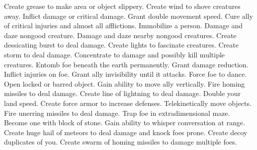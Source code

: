     {Create grease to make area or object slippery.}
    {Create wind to shove creatures away.}
    {Inflict damage or critical damage.}
    {Grant double movement speed.}
    {Cure ally of critical injuries and almost all afflictions.}
    {Immobilize a person.}
    {Damage and daze nongood creature.}
    {Damage and daze nearby nongood creatures.}
    {Create dessicating burst to deal damage.}
    {Create lights to fascinate creatures.}
    {Create storm to deal damage.}
    {Concentrate to damage and possibly kill multiple creatures.}
    {Entomb foe beneath the earth permanently.}
    {Grant damage reduction.}
    {Inflict injuries on foe.}
    {Grant ally invisibility until it attacks.}
    {Force foe to dance.}
    {Open locked or barred object.}
    {Gain ability to move ally vertically.}
    {Fire homing missiles to deal damage.}
    {Create line of lightning to deal damage.}
    {Double your land speed.}
    {Create force armor to increase defenses.}
    {Telekinetically move objects.}
    {Fire unerring missiles to deal damage.}
    {Trap foe in extradimensional maze.}
    {Become one with block of stone.}
    {Gain ability to whisper conversation at range.}
    {Create huge hail of meteors to deal damage and knock foes prone.}
    {Create decoy duplicates of you.}
    {Create swarm of homing missiles to damage multiple foes.}
